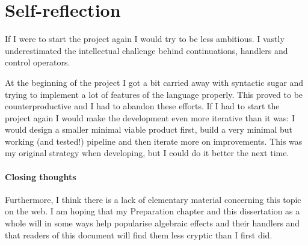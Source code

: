 \documentclass[class=article, crop=false]{standalone}
\begin{document}
\section{Self-reflection}

If I were to start the project again I would try to be less ambitious. I vastly
underestimated the intellectual challenge behind continuations, handlers and
control operators.

At the beginning of the project I got a bit carried away with syntactic sugar
and trying to implement a lot of features of the language properly. This proved
to be counterproductive and I had to abandon these efforts. If I had to start the project
again I would make the development even more iterative than it was: I would
design a smaller minimal viable product first, build a very minimal but working
(and tested!) pipeline and then iterate more on improvements. This was my
original strategy when developing, but I could do it better the next time.

\paragraph{Closing thoughts}

Furthermore, I think there is a lack of elementary material concerning this
topic on the web. I am hoping that my Preparation chapter and this dissertation
as a whole will in some ways help popularise algebraic effects and their
handlers and that readers of this document will find them less cryptic than I
first did.
\end{document}
